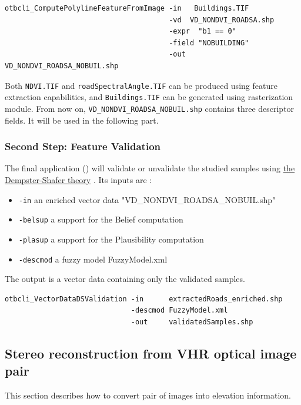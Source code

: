 \begin{verbatim}
otbcli_ComputePolylineFeatureFromImage -in   Buildings.TIF
                                       -vd  VD_NONDVI_ROADSA.shp
                                       -expr  "b1 == 0"
                                       -field "NOBUILDING"
                                       -out   VD_NONDVI_ROADSA_NOBUIL.shp
\end{verbatim}

Both \verb?NDVI.TIF? and \verb?roadSpectralAngle.TIF? can be produced
using \mont feature extraction capabilities, and \verb?Buildings.TIF?
can be generated using \mont rasterization module. From now on,
\verb?VD_NONDVI_ROADSA_NOBUIL.shp? contains three descriptor fields.
It will be used in the following part.

\subsubsection{Second Step: Feature Validation}

The final application () will
validate or unvalidate the studied samples using
\href{http://en.wikipedia.org/wiki/Dempster\%E2\%80\%93Shafer_theory}{the Dempster-Shafer theory}
. Its inputs are :
\begin{itemize}
\item \verb?-in? an enriched vector data "VD\_NONDVI\_ROADSA\_NOBUIL.shp"
\item \verb?-belsup? a support for the Belief computation
\item \verb?-plasup? a support for the Plausibility computation
\item \verb?-descmod? a fuzzy model FuzzyModel.xml
\end{itemize}
The output is a vector data containing only the validated samples.

\begin{verbatim}
otbcli_VectorDataDSValidation -in      extractedRoads_enriched.shp
                              -descmod FuzzyModel.xml
                              -out     validatedSamples.shp
\end{verbatim}

\subsection{Stereo reconstruction from VHR optical image pair}\label{sec:stereoreconstruction}

This section describes how to convert pair of images into elevation information.

